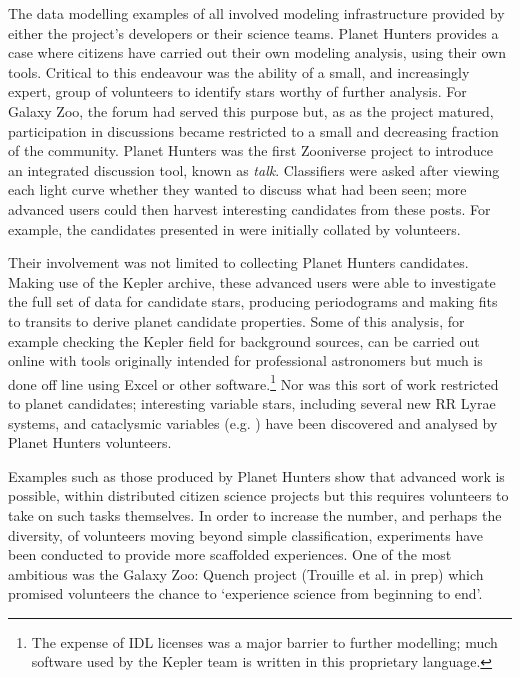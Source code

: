 \documentclass{ar2e}
\begin{document}
The data modelling examples of  all involved modeling
infrastructure provided by either the project's developers or their science
teams. Planet Hunters provides a case where citizens have carried out their own
modeling analysis, using their own tools. Critical to this endeavour was the ability of a small, 
and increasingly expert, group of volunteers to identify stars worthy of further analysis. For
Galaxy Zoo, the forum had served this purpose but, as as the project matured, participation in discussions
became restricted to a small and decreasing fraction of the community. Planet Hunters was the first
Zooniverse project to introduce an integrated discussion tool, known as \emph{talk}. Classifiers were asked
after viewing each light curve whether they wanted to discuss what had been seen; more advanced users
could then harvest interesting candidates from these posts. For example, the candidates presented in \citet{LintottPH} were initially
collated by volunteers.

Their involvement was not limited to collecting Planet Hunters candidates. Making use of the Kepler archive, these
advanced users were able to investigate the full set of data for candidate stars, producing periodograms and making fits 
to transits to derive planet candidate properties. Some of this analysis, for example checking the Kepler field for 
background sources, can be carried out online with tools originally intended for professional astronomers but much
is done off line using Excel or other software.\footnote{The expense of IDL licenses was a major barrier to further modelling; much 
software used by the Kepler team is written in this proprietary language.} Nor was this sort of work restricted to planet candidates; interesting
variable stars, including several new RR Lyrae systems, and cataclysmic variables (e.g. \citet{KatoOsaki}) have been discovered and analysed by
Planet Hunters volunteers. 





Examples such as those produced by Planet Hunters show that advanced work is possible, 
within distributed citizen science projects but this requires volunteers to take on such tasks
themselves. In order to increase the number, and perhaps the diversity, of volunteers moving
beyond simple classification, experiments have been conducted to provide more scaffolded
experiences. One of the most ambitious was the Galaxy Zoo: Quench project (Trouille et al. in prep)
which promised volunteers the chance to `experience science from beginning to end'.
\end{document}
